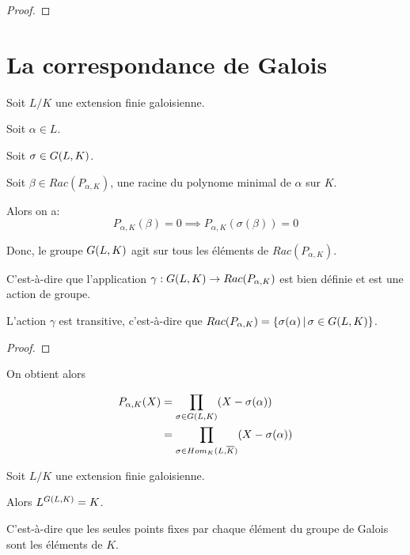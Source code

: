 \ifdefined\outputproof
\begin{proof}

\end{proof}
\fi

\section{La correspondance de Galois}

Soit $L/K$ une extension finie galoisienne.

Soit $\alpha \in L$.

Soit $\sigma \in G(L, K)$.

Soit $\beta \in Rac(P_{\alpha, K})$, une racine du polynome minimal de $\alpha$
sur $K$.

Alors on a:
\begin{equation}
	P_{\alpha, K}(\beta) = 0 \implies P_{\alpha, K}(\sigma(\beta)) = 0
\end{equation}

Donc, le groupe $G(L, K)$ agit sur tous les éléments de
$Rac(P_{\alpha, K})$.

C'est-à-dire que l'application
$\gamma : G(L, K) \rightarrow Rac(P_{\alpha, K})$ est bien définie
et est une action de groupe.

\begin{proposition}
	L'action $\gamma$ est transitive, c'est-à-dire que $Rac(P_{\alpha, K}) =
	\left\{\sigma(\alpha) \, | \, \sigma \in G(L, K) \right\}$.
\end{proposition}

\ifdefined\outputproof
\begin{proof}

\end{proof}
\fi

On obtient alors

\begin{align}
	P_{\alpha, K}(X) &= \displaystyle \prod_{\sigma \in
	G(L, K)} (X - \sigma(\alpha)) \\
	&= \displaystyle \prod_{\sigma \in Hom_{K}(L, \overline{K})} (X - \sigma(\alpha))
\end{align}

\begin{theorem}
	Soit $L/K$ une extension finie galoisienne.

	Alors $L^{G(L, K)} = K$.

	C'est-à-dire que les seules points fixes par chaque élément du groupe de
	Galois sont les éléments de $K$.
\end{theorem}

